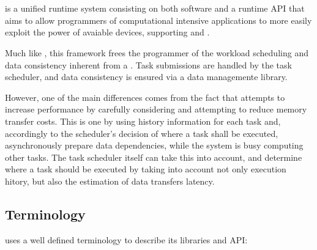 \documentclass[main.tex]{subfiles}
\begin{document}
\section{\starpu} \label{chapter:starpu}

\starpu \cite{augonnet2011starpu} is a unified runtime system consisting on both software and a runtime API that aims to allow programmers of computational intensive applications to more easily exploit the power of avaiable devices, supporting \cpus and \gpus.

Much like \gama, this framework frees the programmer of the workload scheduling and data consistency inherent from a \hetplat. Task submissions are handled by the \starpu task scheduler, and data consistency is ensured via a data managemente library.

However, one of the main differences comes from the fact that \starpu attempts to increase performance by carefully considering and attempting to reduce memory transfer costs. This is one by using history information for each task and, accordingly to the scheduler's decision of where a task shall be executed, asynchronously prepare data dependencies, while the system is busy computing other tasks. The task scheduler itself can take this into account, and determine where a task should be executed by taking into account not only execution hitory, but also the estimation of data transfers latency.

\subsection{Terminology}

\starpu uses a well defined terminology to describe its libraries and API:
\end{document}
